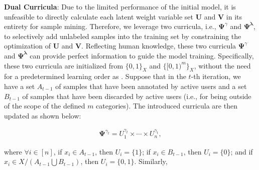 \documentclass[journal]{IEEEtran}
\begin{document}
{\textbf{Dual Curricula}:
Due to the limited performance of the initial model, it is unfeasible to directly calculate each latent weight variable set $\mathbf{U}$ and $\mathbf{V}$ in its entirety for sample mining. Therefore, we leverage two curricula, {i.e.,} $\mathbf{\Psi}^{\gamma}$ and $\mathbf{\Psi}^{{\bm \lambda}}$, to selectively add unlabeled samples into the training set by constraining the optimization of $\mathbf{U}$ and $\mathbf{V}$. Reflecting human knowledge, these two curricula $\mathbf{\Psi}^{\gamma}$ and $\mathbf{\Psi}^{{\bm \lambda}}$ can provide perfect information to guide the model training. Specifically, these two curricula are initialized from $\{0, 1\}_{X}$ and $\{[0, 1)^m\}_X$, without the need for a predetermined learning order {as} \cite{spcl, liang16ijcai}. Suppose that in the $t$-th iteration, we have a set $A_{t-1}$ of samples that have been annotated by active users and a set $B_{t-1}$ of samples that have been discarded by active users (i.e., for being outside of the scope of the defined $m$ categories). The introduced curricula are then updated as shown below: 	

\begin{small}\begin{equation}
\begin{aligned}
\mathbf{\Psi}^{\gamma_t} = U_1^{\gamma_t}\times\cdots\times U^{\gamma_t}_n, \label{eq:c1}
\end{aligned}
\end{equation}\end{small}where $\forall i\in[n]$, if $x_i\in A_{t-1}$, then $U_i=\{1\}$; if $x_i\in B_{t-1}$, then $U_i=\{0\}$; and if $x_i\in X/ (A_{t-1}\bigcup B_{t-1})$, then $U_i=\{0,1\}$. Similarly,

}
\end{document}
